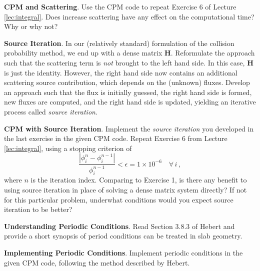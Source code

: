 \begin{exercises}
  \item \textbf{CPM and Scattering}. Use the CPM code to repeat Exercise 6 of Lecture \ref{lec:integral}.  Does increase scattering have any effect on the computational time?  Why or why not?

  \item \textbf{Source Iteration}. In our (relatively standard) formulation of the collision probability method, we end up with a dense matrix $\mathbf{H}$.  Reformulate the approach such that the scattering term is \textit{not} brought to the left hand side.  In this case, $\mathbf{H}$ is just the identity.  However, the right hand side now contains an additional scattering source contribution, which depends on the (unknown) fluxes.  Develop an approach such that the flux is initially guessed, the right hand side is formed, new fluxes are computed, and the right hand side is updated, yielding an iterative process called \textit{source iteration}.  

  \item \textbf{CPM with Source Iteration}. Implement the \textit{source iteration} you developed in the last exercise in the given CPM code.  Repeat Exercise 6 from Lecture \ref{lec:integral}, using a stopping criterion of 
  \begin{equation*}
   \frac{|\phi^n_i-\phi^{n-1}_i|}{\phi^{n-1}_i} < \epsilon = 1\times10^{-6} \, \, \, \, \, \, \forall \, i \, ,
  \end{equation*}
  where $n$ is the iteration index.  Comparing to Exercise 1, is there any benefit to using source iteration in place of solving a dense matrix system directly?  If not for this particular problem, underwhat conditions would you expect source iteration to be better?

  \item \textbf{Understanding Periodic Conditions}. Read Section 3.8.3 of Hebert and provide a short synopsis of period conditions can be treated in slab geometry.

  \item \textbf{Implementing Periodic Conditions}. Implement periodic conditions in the given CPM code, following the method described by Hebert.


\end{exercises}

